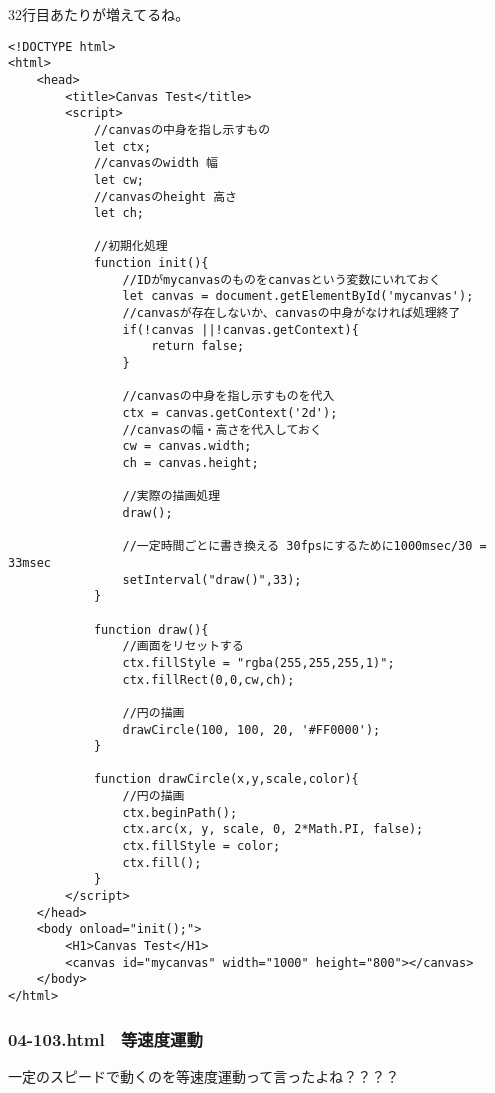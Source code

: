 \documentclass[mingoth,11pt,a4j,uplatex]{jsarticle}
\begin{document}
32行目あたりが増えてるね。
\begin{lstlisting}[caption=一定時間ごとに円を描くけど...動かない]
<!DOCTYPE html>
<html>
	<head>
		<title>Canvas Test</title>
		<script>
			//canvasの中身を指し示すもの
			let ctx;
			//canvasのwidth 幅
			let cw;
			//canvasのheight 高さ
			let ch;
						
			//初期化処理
			function init(){
				//IDがmycanvasのものをcanvasという変数にいれておく
				let canvas = document.getElementById('mycanvas');
				//canvasが存在しないか、canvasの中身がなければ処理終了
				if(!canvas ||!canvas.getContext){
					return false;
				}
				
				//canvasの中身を指し示すものを代入
				ctx = canvas.getContext('2d');
				//canvasの幅・高さを代入しておく
				cw = canvas.width;
				ch = canvas.height;
				
				//実際の描画処理
				draw();
				
				//一定時間ごとに書き換える 30fpsにするために1000msec/30 = 33msec
				setInterval("draw()",33);
			}
			
			function draw(){
				//画面をリセットする
				ctx.fillStyle = "rgba(255,255,255,1)";
				ctx.fillRect(0,0,cw,ch);
				
				//円の描画
				drawCircle(100, 100, 20, '#FF0000');
			}
			
			function drawCircle(x,y,scale,color){
				//円の描画
				ctx.beginPath();
				ctx.arc(x, y, scale, 0, 2*Math.PI, false);
				ctx.fillStyle = color;
				ctx.fill();
			}
		</script>
	</head>
	<body onload="init();">
		<H1>Canvas Test</H1>
		<canvas id="mycanvas" width="1000" height="800"></canvas>
	</body>
</html>
\end{lstlisting}

\subsubsection{04-103.html　等速度運動}
一定のスピードで動くのを等速度運動って言ったよね？？？？
\end{document}
